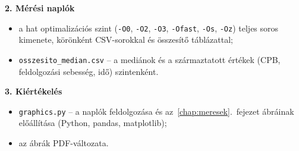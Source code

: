 \documentclass[a4paper,12pt]{report}
\theoremstyle{definition}
\theoremstyle{remark}
\begin{document}
\noindent\textbf{2. Mérési naplók}
\begin{itemize}
	\item a hat optimalizációs szint (\texttt{-O0}, \texttt{-O2}, \texttt{-O3}, \texttt{-Ofast}, \texttt{-Os}, \texttt{-Oz}) teljes soros kimenete, körönként CSV-sorokkal és összesítő táblázattal;
	\item \texttt{osszesito\_median.csv} -- a mediánok és a származtatott értékek (CPB, feldolgozási sebesség, idő) szintenként.
\end{itemize}

\noindent\textbf{3. Kiértékelés}
\begin{itemize}
	\item \texttt{graphics.py} -- a naplók feldolgozása és az~\ref{chap:meresek}.~fejezet ábráinak előállítása (Python, pandas, matplotlib);
	\item az ábrák PDF-változata.
\end{itemize}
\end{document}
